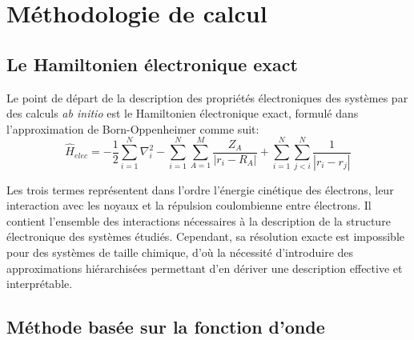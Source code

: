 \documentclass[12pt,a4paper]{report}
\numberwithin{equation}{section}
\begin{document}
\section*{Méthodologie de calcul}

\subsection*{Le Hamiltonien électronique exact}

Le point de départ de la description des propriétés électroniques des systèmes par des calculs \textit{ab initio} est le Hamiltonien électronique exact, formulé dans l’approximation de Born-Oppenheimer comme suit:
\begin{equation}
  \hat{H}_{elec}=-\frac{1}{2}\sum_{i=1}^{N}\nabla_i^2%
  -\sum_{i=1}^{N}\sum_{A=1}^{M}\frac{Z_A}{|r_i-R_A|}+\sum_{i=1}^{N}\sum_{j<i}^{N}\frac{1}{|r_i-r_j|}%
\end{equation}

Les trois termes représentent dans l'ordre l’énergie cinétique des électrons, leur interaction avec les noyaux et la répulsion coulombienne entre électrons.  
Il contient l’ensemble des interactions nécessaires à la description de la structure électronique des systèmes étudiés.  
Cependant, sa résolution exacte est impossible pour des systèmes de taille chimique, d’où la nécessité d’introduire des approximations hiérarchisées permettant d’en dériver une description effective et interprétable.

\subsection*{Méthode basée sur la fonction d'onde}
\end{document}
